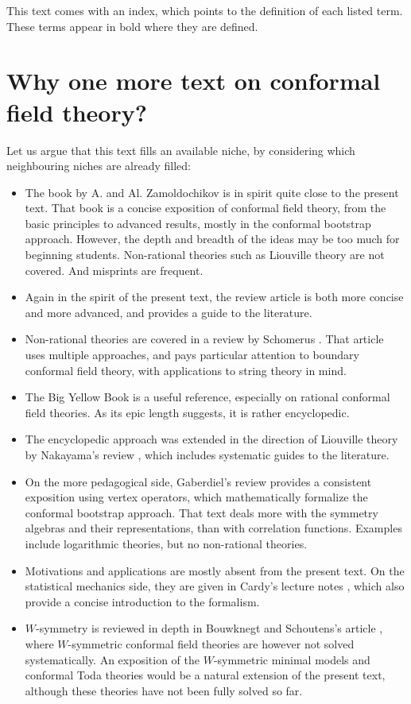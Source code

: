 \documentclass[12pt, a4paper, notitlepage, twoside]{report}
\numberwithin{equation}{section}
\theoremstyle{break}
\begin{document}
This text comes with an index, which points to the definition of each listed term. 
These terms appear in bold where they are defined.


\section{Why one more text on conformal field theory?}

Let us argue that this text fills an available niche, by considering which neighbouring niches are already filled: 
\begin{itemize}
\item 
The book \cite{zz90} by A. and Al. Zamoldochikov is in spirit quite close to the present text.
That book is a concise exposition of conformal field theory, from the basic principles to advanced results, mostly in the conformal bootstrap approach.
However, the depth and breadth of the ideas may be too much for beginning students.
Non-rational theories such as Liouville theory are not covered.
And misprints are frequent.
\item
Again in the spirit of the present text, the review article \cite{tes17} is both more concise and more advanced, and provides a guide to the literature.
\item
Non-rational theories are covered in a review by Schomerus \cite{sch05}.
That article uses multiple approaches, and pays particular attention to boundary conformal field theory, with applications to string theory in mind. 
\item
The Big Yellow Book \cite{fms97} is a useful reference, especially on rational conformal field theories.
As its epic length suggests, it is rather encyclopedic. 
\item
The encyclopedic approach was extended in the direction of Liouville theory by Nakayama's review \cite{nak04}, which includes systematic guides to the literature.
\item 
On the more pedagogical side, Gaberdiel's review \cite{gab99} provides a consistent exposition using vertex operators, which mathematically formalize the conformal bootstrap approach.
That text deals more with the symmetry algebras and their representations, than with correlation functions.
Examples include logarithmic theories, but no non-rational theories.
\item
Motivations and applications are mostly absent from the present text.
On the statistical mechanics side, they are given in Cardy's lecture notes \cite{car08}, which also provide a concise introduction to the formalism.
\item 
$W$-symmetry is reviewed in depth in Bouwknegt and Schoutens's article \cite{bs92}, where $W$-symmetric conformal field theories are however not solved systematically.
An exposition of the $W$-symmetric minimal models and conformal Toda theories would be a natural extension of the present text, although these theories have not been fully solved so far. 
\end{itemize}
\end{document}
